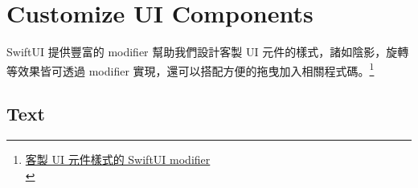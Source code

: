 \documentclass[a4paper,12pt]{article}
\begin{document}
\section{Customize UI Components}
\label{sec:org800f38c}
SwiftUI 提供豐富的 modifier 幫助我們設計客製 UI 元件的樣式，諸如陰影，旋轉等效果皆可透過 modifier 實現，還可以搭配方便的拖曳加入相關程式碼。\footnote{\href{https://medium.com/\%E5\%BD\%BC\%E5\%BE\%97\%E6\%BD\%98\%E7\%9A\%84-swift-ios-app-\%E9\%96\%8B\%E7\%99\%BC\%E5\%95\%8F\%E9\%A1\%8C\%E8\%A7\%A3\%E7\%AD\%94\%E9\%9B\%86/\%E5\%AE\%A2\%E8\%A3\%BD-ui-\%E5\%85\%83\%E4\%BB\%B6\%E6\%A8\%A3\%E5\%BC\%8F\%E7\%9A\%84-swiftui-modifier-b31ff65c1f0d}{客製 UI 元件樣式的 SwiftUI modifier}\\}\\

\subsection{Text}
\label{sec:orge28b386}
\end{document}
